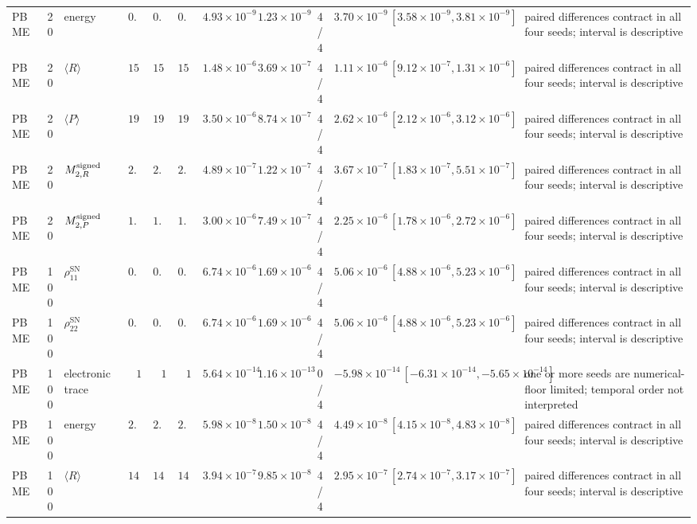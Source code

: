 \documentclass[
  11pt,
  letterpaper,
  onehalfspacing,
  normalmargins,
  equalmargins,
  oneside
]{ut-thesis}
\begin{document}
\begin{landscape}
\begin{longtable}{l r l r r r r r r r L{0.15\textwidth}}
PBME & 20 & energy & $0.1$ & $0.1$ & $0.1$ & $4.93\times10^{-9}$ & $1.23\times10^{-9}$ & 4/4 & $3.70\times10^{-9}\,[3.58\times10^{-9},3.81\times10^{-9}]$ & paired differences contract in all four seeds; interval is descriptive \\
PBME & 20 & $\langle R\rangle$ & $15.3$ & $15.3$ & $15.3$ & $1.48\times10^{-6}$ & $3.69\times10^{-7}$ & 4/4 & $1.11\times10^{-6}\,[9.12\times10^{-7},1.31\times10^{-6}]$ & paired differences contract in all four seeds; interval is descriptive \\
PBME & 20 & $\langle P\rangle$ & $19.8$ & $19.8$ & $19.8$ & $3.50\times10^{-6}$ & $8.74\times10^{-7}$ & 4/4 & $2.62\times10^{-6}\,[2.12\times10^{-6},3.12\times10^{-6}]$ & paired differences contract in all four seeds; interval is descriptive \\
PBME & 20 & $M^{\rm signed}_{2,R}$ & $2.31$ & $2.31$ & $2.31$ & $4.89\times10^{-7}$ & $1.22\times10^{-7}$ & 4/4 & $3.67\times10^{-7}\,[1.83\times10^{-7},5.51\times10^{-7}]$ & paired differences contract in all four seeds; interval is descriptive \\
PBME & 20 & $M^{\rm signed}_{2,P}$ & $1.66$ & $1.66$ & $1.66$ & $3.00\times10^{-6}$ & $7.49\times10^{-7}$ & 4/4 & $2.25\times10^{-6}\,[1.78\times10^{-6},2.72\times10^{-6}]$ & paired differences contract in all four seeds; interval is descriptive \\
PBME & 100 & $\rho_{11}^{\mathrm{SN}}$ & $0.137$ & $0.137$ & $0.137$ & $6.74\times10^{-6}$ & $1.69\times10^{-6}$ & 4/4 & $5.06\times10^{-6}\,[4.88\times10^{-6},5.23\times10^{-6}]$ & paired differences contract in all four seeds; interval is descriptive \\
PBME & 100 & $\rho_{22}^{\mathrm{SN}}$ & $0.863$ & $0.863$ & $0.863$ & $6.74\times10^{-6}$ & $1.69\times10^{-6}$ & 4/4 & $5.06\times10^{-6}\,[4.88\times10^{-6},5.23\times10^{-6}]$ & paired differences contract in all four seeds; interval is descriptive \\
PBME & 100 & electronic trace & $1$ & $1$ & $1$ & $5.64\times10^{-14}$ & $1.16\times10^{-13}$ & 0/4 & $-5.98\times10^{-14}\,[-6.31\times10^{-14},-5.65\times10^{-14}]$ & one or more seeds are numerical-floor limited; temporal order not interpreted \\
PBME & 100 & energy & $2.5$ & $2.5$ & $2.5$ & $5.98\times10^{-8}$ & $1.50\times10^{-8}$ & 4/4 & $4.49\times10^{-8}\,[4.15\times10^{-8},4.83\times10^{-8}]$ & paired differences contract in all four seeds; interval is descriptive \\
PBME & 100 & $\langle R\rangle$ & $14.9$ & $14.9$ & $14.9$ & $3.94\times10^{-7}$ & $9.85\times10^{-8}$ & 4/4 & $2.95\times10^{-7}\,[2.74\times10^{-7},3.17\times10^{-7}]$ & paired differences contract in all four seeds; interval is descriptive \\

\end{longtable}
\end{landscape}
\end{document}
